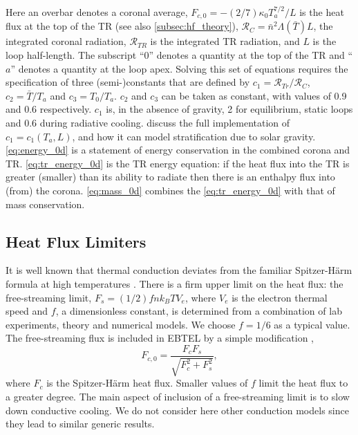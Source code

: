 \documentclass[apj]{emulateapj}
\begin{document}
Here an overbar denotes a coronal average, $F_{c,0} = -(2/7)\kappa_0 T_a^{7/2}/L$ is the heat flux at the top of the TR (see also \autoref{subsec:hf_theory}), $\mathcal{R}_C=\bar{n}^2\Lambda(\bar{T})L$, the integrated coronal radiation, $\mathcal{R}_{TR}$ is the integrated TR radiation, and $L$ is the loop half-length. The subscript ``0'' denotes a quantity at the top of the TR and ``$a$'' denotes a quantity at the loop apex. Solving this set of equations requires the specification of three (semi-)constants that are defined by  $c_1=\mathcal{R}_{Tr}/\mathcal{R}_C$, $c_2=\bar{T}/T_a$ and $c_3=T_0/T_a$. $c_2$ and $c_3$ can be taken as constant, with values of 0.9 and 0.6 respectively. $c_1$ is, in the absence of gravity, 2 for equilibrium, static loops and 0.6 during radiative cooling. \citet{cargill_enthalpy-based_2012} discuss the full implementation of $c_1 = c_1(T_a,L)$, and how it can model stratification due to solar gravity. \autoref{eq:energy_0d} is a statement of energy conservation in the combined corona and TR. \autoref{eq:tr_energy_0d} is the TR energy equation: if the heat flux into the TR is greater (smaller) than its ability to radiate then there is an enthalpy flux into (from) the corona. \autoref{eq:mass_0d} combines the \autoref{eq:tr_energy_0d} with that of mass conservation.
	
	\subsection{Heat Flux Limiters}
	\label{subsec:hf_theory}
	\par It is well known that thermal conduction deviates from the familiar Spitzer-H{\"a}rm formula \citep{spitzer_transport_1953} at high temperatures \citep[e.g.][]{ljepojevic_heat_1989}. There is a firm upper limit on the heat flux: the free-streaming limit, $F_s=(1/2)fnk_BTV_e$, where $V_e$ is the electron thermal speed and $f$, a dimensionless constant, is determined from a combination of lab experiments, theory and numerical models. We choose $f = 1/6$ as a typical value. The free-streaming flux is included in EBTEL by a simple modification \citep{klimchuk_highly_2008},
	\begin{equation}
		F_{c,0} = \frac{F_cF_s}{\sqrt{F_c^2 + F_s^2}},
	\end{equation}
where $F_c$ is the Spitzer-H{\"a}rm heat flux. Smaller values of $f$ limit the heat flux to a greater degree. The main aspect of inclusion of a free-streaming limit is to slow down conductive cooling. We do not consider here other conduction models \citep[e.g. the non-local model discussed in the coronal context by][]{karpen_nonlocal_1987,ciaravella_non-local_1991,west_lifetime_2008} since they lead to similar generic results. 
\end{document}

